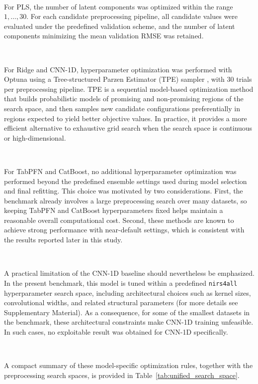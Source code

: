 \documentclass{article}
\begin{document}
~

For PLS, the number of latent components was optimized within the range ${1,\dots,30}$. For each candidate preprocessing pipeline, all candidate values were evaluated under the predefined validation scheme, and the number of latent components minimizing the mean validation RMSE was retained.

~

For Ridge and CNN-1D, hyperparameter optimization was performed with Optuna \cite{akiba_2019_optuna} using a Tree-structured Parzen Estimator (TPE) sampler \cite{bergstra_2011_tpe}, with 30 trials per preprocessing pipeline. TPE is a sequential model-based optimization method that builds probabilistic models of promising and non-promising regions of the search space, and then samples new candidate configurations preferentially in regions expected to yield better objective values. In practice, it provides a more efficient alternative to exhaustive grid search when the search space is continuous or high-dimensional.

~

For TabPFN and CatBoost, no additional hyperparameter optimization was performed beyond the predefined ensemble settings used during model selection and final refitting. This choice was motivated by two considerations. First, the benchmark already involves a large preprocessing search over many datasets, so keeping TabPFN and CatBoost hyperparameters fixed helps maintain a reasonable overall computational cost. Second, these methods are known to achieve strong performance with near-default settings, which is consistent with the results reported later in this study.

~

A practical limitation of the CNN-1D baseline should nevertheless be emphasized. In the present benchmark, this model is tuned within a predefined \texttt{nirs4all} hyperparameter search space, including architectural choices such as kernel sizes, convolutional widths, and related structural parameters (for more details see Supplementary Material). As a consequence, for some of the smallest datasets in the benchmark, these architectural constraints make CNN-1D training unfeasible. In such cases, no exploitable result was obtained for CNN-1D specifically.


~

A compact summary of these model-specific optimization rules, together with the preprocessing search spaces, is provided in Table~\ref{tab:unified_search_space}.
\end{document}
